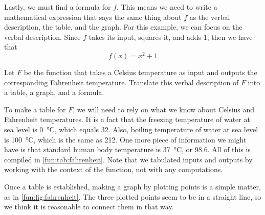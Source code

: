 \begin{pccexample}
\begin{pccsolution}
Lastly, we must find a formula for $f$. This means we need to write a mathematical expression that says the same thing about $f$ as the verbal description, the table, and the graph. For this example, we can focus on the verbal description. Since $f$ takes its input, squares it, and adds \num{1}, then we have that 
\[
f(x)=x^2+1
\]

\end{pccsolution}
\end{pccexample}

\begin{pccexample}
Let $F$ be the function that takes a Celsius temperature as input and outputs the corresponding Fahrenheit temperature. Translate this verbal description of $F$ into a table, a graph, and a formula.

\begin{pccsolution}
To make a table for $F$, we will need to rely on what we know about Celsius and Fahrenheit temperatures. It is a fact that the freezing temperature of water at sea level is \SI{0}{\celsius}, which equals \SI{32}{\Fahrenheit}. Also, boiling temperature of water at sea level is \SI{100}{\celsius}, which is the same as \SI{212}{\Fahrenheit}. One more piece of information we might have is that standard human body temperature is \SI{37}{\celsius}, or \SI{98.6}{\Fahrenheit}. All of this is compiled in \cref{fun:tab:fahrenheit}. Note that we tabulated inputs and outputs by working with the context of the function, not with any computations.

Once a table is established, making a graph by plotting points is a simple matter, as in \cref{fun:fig:fahrenheit}. The three plotted points seem to be in a straight line, so we think it is reasonable to connect them in that way.


\end{pccsolution}
\end{pccexample}
